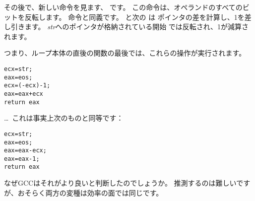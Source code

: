 \label{strlen_NOT_ADD}

その後で、新しい命令を見ます、 \NOT です。 この命令は、オペランドのすべてのビットを反転します。
命令と同義です。 
\NOT と次の \ADD は ポインタの差を計算し、1を差し引きます。 
\emph{str}へのポインタが格納されている開始 \ECX では反転され、1が減算されます。

つまり、ループ本体の直後の関数の最後では、これらの操作が実行されます。

\begin{lstlisting}[style=customc]
ecx=str;
eax=eos;
ecx=(-ecx)-1; 
eax=eax+ecx
return eax
\end{lstlisting}

\dots~これは事実上次のものと同等です：

\begin{lstlisting}[style=customc]
ecx=str;
eax=eos;
eax=eax-ecx;
eax=eax-1;
return eax
\end{lstlisting}

なぜGCCはそれがより良いと判断したのでしょうか。
推測するのは難しいですが、おそらく両方の変種は効率の面では同じです。
